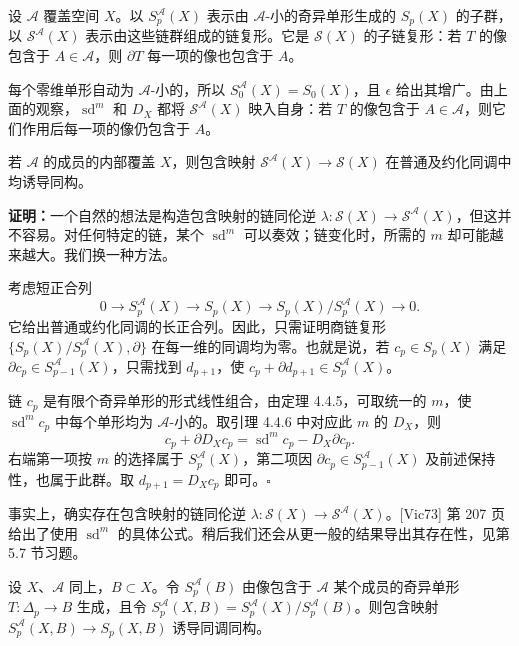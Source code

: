 设 $\mathcal A$ 覆盖空间 $X$。以 $S_p^{\mathcal A}(X)$ 表示由 $\mathcal A$-小的奇异单形生成的 $S_p(X)$ 的子群，以 $\mathcal S^{\mathcal A}(X)$ 表示由这些链群组成的链复形。它是 $\mathcal S(X)$ 的子链复形：若 $T$ 的像包含于 $A\in\mathcal A$，则 $\partial T$ 每一项的像也包含于 $A$。

每个零维单形自动为 $\mathcal A$-小的，所以 $S_0^{\mathcal A}(X)=S_0(X)$，且 $\epsilon$ 给出其增广。由上面的观察，$\operatorname{sd}^m$ 和 $D_X$ 都将 $\mathcal S^{\mathcal A}(X)$ 映入自身：若 $T$ 的像包含于 $A\in\mathcal A$，则它们作用后每一项的像仍包含于 $A$。

若 $\mathcal A$ 的成员的内部覆盖 $X$，则包含映射 $\mathcal S^{\mathcal A}(X)\to\mathcal S(X)$ 在普通及约化同调中均诱导同构。

\textbf{证明：}一个自然的想法是构造包含映射的链同伦逆 $\lambda:\mathcal S(X)\to\mathcal S^{\mathcal A}(X)$，但这并不容易。对任何特定的链，某个 $\operatorname{sd}^m$ 可以奏效；链变化时，所需的 $m$ 却可能越来越大。我们换一种方法。

考虑短正合列
\[
0\longrightarrow S_p^{\mathcal A}(X)\longrightarrow S_p(X)\longrightarrow S_p(X)/S_p^{\mathcal A}(X)\longrightarrow0.
\]
它给出普通或约化同调的长正合列。因此，只需证明商链复形 $\{S_p(X)/S_p^{\mathcal A}(X),\partial\}$ 在每一维的同调均为零。也就是说，若 $c_p\in S_p(X)$ 满足 $\partial c_p\in S_{p-1}^{\mathcal A}(X)$，只需找到 $d_{p+1}$，使 $c_p+\partial d_{p+1}\in S_p^{\mathcal A}(X)$。

链 $c_p$ 是有限个奇异单形的形式线性组合，由定理 4.4.5，可取统一的 $m$，使 $\operatorname{sd}^mc_p$ 中每个单形均为 $\mathcal A$-小的。取引理 4.4.6 中对应此 $m$ 的 $D_X$，则
\[
c_p+\partial D_Xc_p=\operatorname{sd}^mc_p-D_X\partial c_p.
\]
右端第一项按 $m$ 的选择属于 $S_p^{\mathcal A}(X)$，第二项因 $\partial c_p\in S_{p-1}^{\mathcal A}(X)$ 及前述保持性，也属于此群。取 $d_{p+1}=D_Xc_p$ 即可。\hfill$\square$

事实上，确实存在包含映射的链同伦逆 $\lambda:\mathcal S(X)\to\mathcal S^{\mathcal A}(X)$。[Vic73] 第 207 页给出了使用 $\operatorname{sd}^m$ 的具体公式。稍后我们还会从更一般的结果导出其存在性，见第 5.7 节习题。

设 $X$、$\mathcal A$ 同上，$B\subset X$。令 $S_p^{\mathcal A}(B)$ 由像包含于 $\mathcal A$ 某个成员的奇异单形 $T:\Delta_p\to B$ 生成，且令 $S_p^{\mathcal A}(X,B)=S_p^{\mathcal A}(X)/S_p^{\mathcal A}(B)$。则包含映射 $S_p^{\mathcal A}(X,B)\to S_p(X,B)$ 诱导同调同构。

